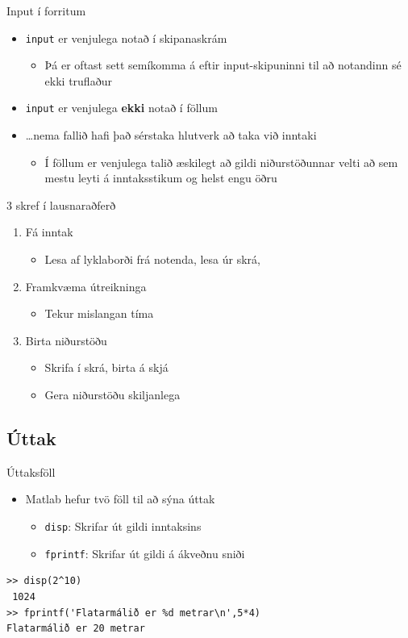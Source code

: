 \documentclass[handout]{beamer}
\begin{document}
\begin{frame}{Input í forritum}
\begin{itemize}
 \item \texttt{input} er venjulega notað í skipanaskrám
 \begin{itemize}
  \item Þá er oftast sett semíkomma á eftir input-skipuninni til að notandinn sé ekki truflaður
 \end{itemize}
 \item \texttt{input} er venjulega \textbf{ekki} notað í föllum
 \item \ldots nema fallið hafi það sérstaka hlutverk að taka við inntaki
 \begin{itemize}
  \item Í föllum er venjulega talið æskilegt að gildi niðurstöðunnar velti að sem mestu leyti á inntaksstikum og helst engu öðru
 \end{itemize}
\end{itemize}
\end{frame}

\begin{frame}{3 skref í lausnaraðferð}
\begin{enumerate}
 \item Fá inntak
 \begin{itemize}
  \item Lesa af lyklaborði frá notenda, lesa úr skrá, 
 \end{itemize}
 \item Framkvæma útreikninga
 \begin{itemize}
  \item Tekur mislangan tíma
 \end{itemize}
 \item Birta niðurstöðu
 \begin{itemize}
  \item Skrifa í skrá, birta á skjá
  \item Gera niðurstöðu skiljanlega
 \end{itemize}
\end{enumerate}
\end{frame}

\subsection{Úttak}

\begin{frame}[fragile]{Úttaksföll}
\begin{itemize}
 \item Matlab hefur tvö föll til að sýna úttak
 \begin{itemize}
  \item \texttt{disp}: Skrifar út gildi inntaksins
  \item \texttt{fprintf}: Skrifar út gildi á ákveðnu sniði
 \end{itemize}
\end{itemize}
\begin{verbatim}
>> disp(2^10)
 1024
>> fprintf('Flatarmálið er %d metrar\n',5*4)
Flatarmálið er 20 metrar
\end{verbatim}
\end{frame}
\end{document}
